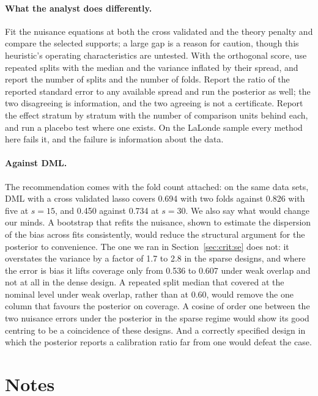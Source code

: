 \paragraph{What the analyst does differently.} Fit the nuisance equations at both the cross validated and the theory penalty and compare the selected supports; a large gap is a reason for caution, though this heuristic's operating characteristics are untested. With the orthogonal score, use repeated splits with the median and the variance inflated by their spread, and report the number of splits and the number of folds. Report the ratio of the reported standard error to any available spread and run the posterior as well; the two disagreeing is information, and the two agreeing is not a certificate. Report the effect stratum by stratum with the number of comparison units behind each, and run a placebo test where one exists. On the LaLonde sample every method here fails it, and the failure is information about the data.

\paragraph{Against DML.} The recommendation comes with the fold count attached: on the same data sets, DML with a cross validated lasso covers 0.694 with two folds against 0.826 with five at $s = 15$, and 0.450 against 0.734 at $s = 30$. We also say what would change our minds. A bootstrap that refits the nuisance, shown to estimate the dispersion of the bias across fits consistently, would reduce the structural argument for the posterior to convenience. The one we ran in Section~\ref{sec:crit:se} does not: it overstates the variance by a factor of 1.7 to 2.8 in the sparse designs, and where the error is bias it lifts coverage only from 0.536 to 0.607 under weak overlap and not at all in the dense design. A repeated split median that covered at the nominal level under weak overlap, rather than at 0.60, would remove the one column that favours the posterior on coverage. A cosine of order one between the two nuisance errors under the posterior in the sparse regime would show its good centring to be a coincidence of these designs. And a correctly specified design in which the posterior reports a calibration ratio far from one would defeat the case.

\section*{Notes}

